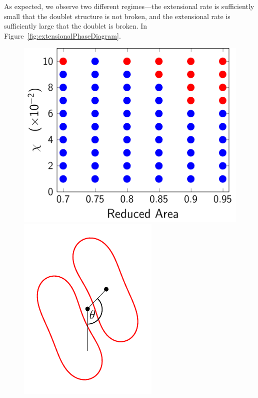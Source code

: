 \documentclass[prf,superscriptaddress,showpacs]{revtex4-1}
\begin{document}
As expected, we observe two different regimes---the extensional rate is
sufficiently small that the doublet structure is not broken, and the
extensional rate is sufficiently large that the doublet is broken.  In
Figure~\ref{fig:extensionalPhaseDiagram}.

\begin{figure}[htp]
  \begin{minipage}{0.6\textwidth}
    \centering
    \includegraphics[width=\textwidth]{figs/extensional_adR4em1adS7em1_phaseDiagram.pdf}
  \end{minipage}
  \hfill
  \begin{minipage}{0.33\textwidth}
    \centering
    \includegraphics[width=\textwidth]{figs/angleDefinition.pdf}

\end{minipage}
\end{figure}
\end{document}
